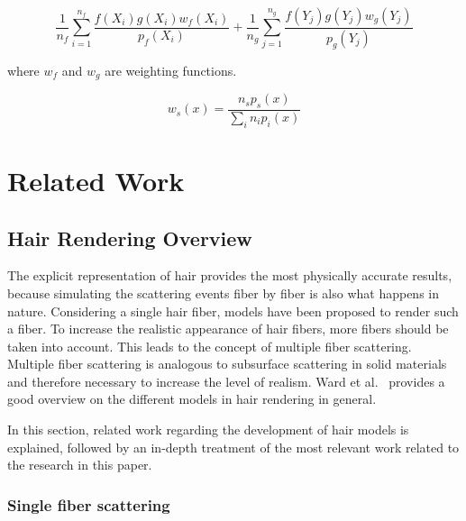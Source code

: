 \documentclass[11pt,a4paper]{report}
\begin{document}
\begin{equation}
\frac{1}{n_f} \sum_{i=1}^{n_f} \frac{f(X_i)g(X_i) w_f(X_i)}{p_f(X_i)} + 
\frac{1}{n_g} \sum_{j=1}^{n_g} \frac{f(Y_j)g(Y_j) w_g(Y_j)}{p_g(Y_j)} 
\end{equation}

where $w_f$ and $w_g$ are weighting functions.

\begin{equation}
w_s(x) = \frac{n_sp_s(x)}{\sum_i n_i p_i(x)}
\end{equation}




\chapter{Related Work}






\section{Hair Rendering Overview}

The explicit representation of hair provides the most physically accurate results, because simulating the scattering events fiber by fiber is also what happens in nature. Considering a single hair fiber, models have been proposed to render such a fiber. To increase the realistic appearance of hair fibers, more fibers should be taken into account. This leads to the concept of multiple fiber scattering. Multiple fiber scattering is analogous to subsurface scattering in solid materials and therefore necessary to increase the level of realism. Ward et al.~\cite{ward} provides a good overview on the different models in hair rendering in general.

In this section, related work regarding the development of hair models is explained, followed by an in-depth treatment of the most relevant work related to the research in this paper.


\subsection{Single fiber scattering}
\end{document}
